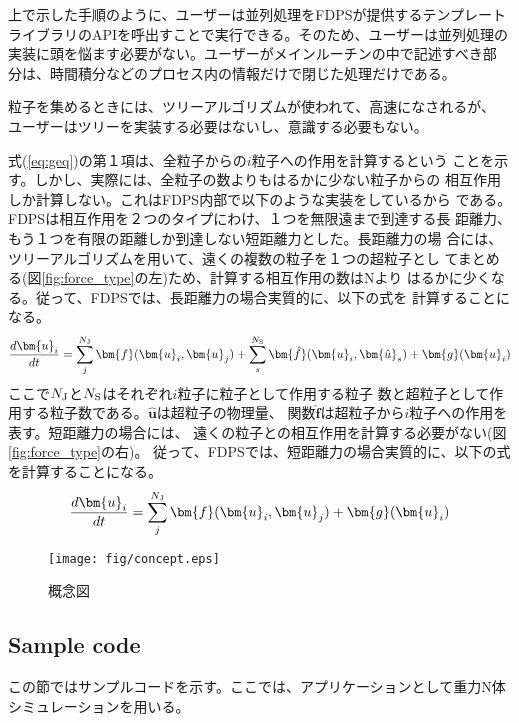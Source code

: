 \documentclass[12pt,a4paper]{jarticle}
\begin{document}
上で示した手順のように、ユーザーは並列処理をFDPSが提供するテンプレート
ライブラリのAPIを呼出すことで実行できる。そのため、ユーザーは並列処理の
実装に頭を悩ます必要がない。ユーザーがメインルーチンの中で記述すべき部
分は、時間積分などのプロセス内の情報だけで閉じた処理だけである。

粒子を集めるときには、ツリーアルゴリズムが使われて、高速になされるが、
ユーザーはツリーを実装する必要はないし、意識する必要もない。

式(\ref{eq:geq})の第１項は、全粒子からの$i$粒子への作用を計算するという
ことを示す。しかし、実際には、全粒子の数よりもはるかに少ない粒子からの
相互作用しか計算しない。これはFDPS内部で以下のような実装をしているから
である。FDPSは相互作用を２つのタイプにわけ、１つを無限遠まで到達する長
距離力、もう１つを有限の距離しか到達しない短距離力とした。長距離力の場
合には、ツリーアルゴリズムを用いて、遠くの複数の粒子を１つの超粒子とし
てまとめる(図\ref{fig:force_type}の左)ため、計算する相互作用の数はNより
はるかに少くなる。従って、FDPSでは、長距離力の場合実質的に、以下の式を
計算することになる。
\begin{align}
  \frac{d\bm{u}_i}{dt} = \sum_{j}^{N_{\rm J}}
  \bm{f}(\bm{u}_i,\bm{u}_j) + \sum_{s}^{N_{\rm S}}
  \bm{\hat{f}}(\bm{u}_i,\bm{\hat{u}}_s) +
  \bm{g}(\bm{u}_i) \label{eq:geqLong}
\end{align}
ここで$N_{\rm J}$と$N_{\rm S}$はそれぞれ$i$粒子に粒子として作用する粒子
数と超粒子として作用する粒子数である。$\bm{\hat{u}}$は超粒子の物理量、
関数$\bm{\hat{f}}$は超粒子から$i$粒子への作用を表す。短距離力の場合には、
遠くの粒子との相互作用を計算する必要がない(図\ref{fig:force_type}の右)。
従って、FDPSでは、短距離力の場合実質的に、以下の式を計算することになる。
\begin{align}
  \frac{d\bm{u}_i}{dt} = \sum_{j}^{N_{\rm J}}
  \bm{f}(\bm{u}_i,\bm{u}_j) + \bm{g}(\bm{u}_i) \label{eq:geqShort}
\end{align}

\begin{figure}
  \begin{center}
    \texttt{[image: fig/concept.eps]}
  \end{center}
  \caption{概念図}
  \label{fig:concept}
\end{figure}

\subsection{Sample code}

この節ではサンプルコードを示す。ここでは、アプリケーションとして重力N体
シミュレーションを用いる。
\end{document}
